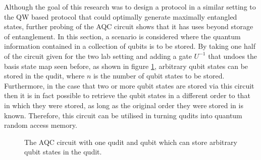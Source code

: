 \FloatBarrier
Although the goal of this research was to design a protocol in a similar setting to the QW based protocol that could optimally generate maximally entangled states, further probing of the AQC circuit shows that it has uses beyond storage of entanglement.
In this section, a scenario is considered where the quantum information contained in a collection of qubits is to be stored.
By taking one half of the circuit given for the two lab setting and adding a gate $U^{-1}$ that undoes the basis state map seen before, as shown in figure \ref{fig:aqc_qbit_store}, arbitrary qubit states can be stored in the qudit, where $n$ is the number of qubit states to be stored.
Furthermore, in the case that two or more qubit states are stored via this circuit then it is in fact possible to retrieve the qubit states in a different order to that in which they were stored, as long as the original order they were stored in is known.
Therefore, this circuit can be utilised in turning qudits into quantum random access memory.

\begin{figure}[h]
    \begin{center}
    \caption{The AQC circuit with one qudit and qubit which can store arbitrary qubit states in the qudit.}
    \label{fig:aqc_qbit_store}
    \end{center}
\end{figure}


